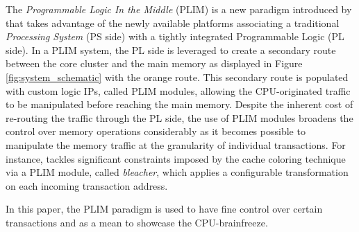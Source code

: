 
    The \emph{Programmable Logic In the Middle} (PLIM) is a new paradigm introduced by \cite{PLIM20} that takes advantage of the newly available platforms associating a traditional \emph{Processing System} (PS side) with a tightly integrated Programmable Logic (PL side).
    In a PLIM system, the PL side is leveraged to create a secondary route between the core cluster and the main memory as displayed in Figure \ref{fig:system_schematic} with the orange route.
    This secondary route is populated with custom logic IPs, called PLIM modules, allowing the CPU-originated traffic to be manipulated before reaching the main memory.
    Despite the inherent cost of re-routing the traffic through the PL side, the use of PLIM modules broadens the control over memory operations considerably as it becomes possible to manipulate the memory traffic at the granularity of individual transactions.
    For instance, \cite{PLIM20} tackles significant constraints imposed by the cache coloring technique via a PLIM module, called \emph{bleacher}, which applies a configurable transformation on each incoming transaction address.

    In this paper, the PLIM paradigm is used to have fine control over certain transactions and as a mean to showcase the CPU-brainfreeze.
